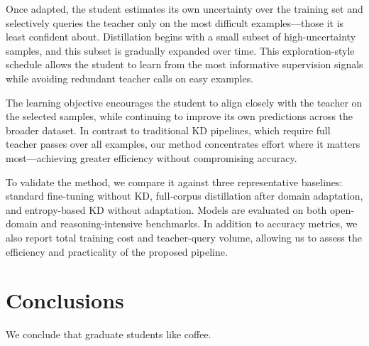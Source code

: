 \documentclass[draft]{uiucthesis2021}
\newcounter{counterforappendices}
\begin{document}
Once adapted, the student estimates its own uncertainty over the training set and selectively queries the teacher only on the most difficult examples—those it is least confident about. Distillation begins with a small subset of high-uncertainty samples, and this subset is gradually expanded over time. This exploration-style schedule allows the student to learn from the most informative supervision signals while avoiding redundant teacher calls on easy examples.

The learning objective encourages the student to align closely with the teacher on the selected samples, while continuing to improve its own predictions across the broader dataset. In contrast to traditional KD pipelines, which require full teacher passes over all examples, our method concentrates effort where it matters most—achieving greater efficiency without compromising accuracy.

To validate the method, we compare it against three representative baselines: standard fine-tuning without KD, full-corpus distillation after domain adaptation, and entropy-based KD without adaptation. Models are evaluated on both open-domain and reasoning-intensive benchmarks. In addition to accuracy metrics, we also report total training cost and teacher-query volume, allowing us to assess the efficiency and practicality of the proposed pipeline.



\chapter{Conclusions}

We conclude that graduate students like coffee.


\backmatter

\printbibliography[heading=bibintoc,title={References}]








% 
\end{document}
